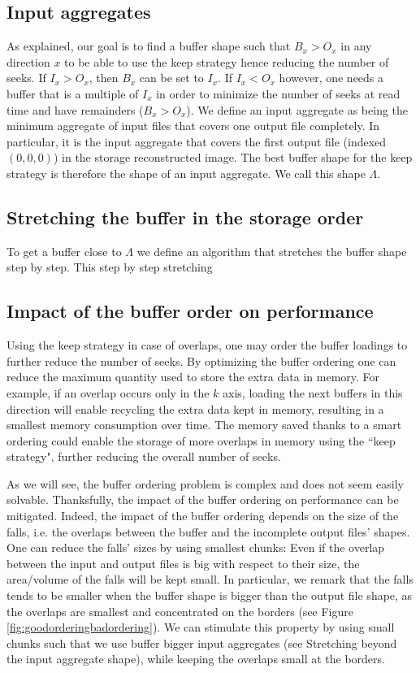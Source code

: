 \documentclass[conference]{IEEEtran}
\begin{document}
\subsection{Input aggregates}
As explained, our goal is to find a buffer shape such that $B_x>O_x$ in any
direction $x$ to be able to use the keep strategy hence reducing the number of
seeks. If $I_x > O_x$, then $B_x$ can be set to $I_x$. If $I_x < O_x$ however,
one needs a buffer that is a multiple of $I_x$ in order to minimize the number
of seeks at read time and have remainders ($B_x>O_x$). We define an input
aggregate as being the minimum aggregate of input files that covers one output
file completely. In particular, it is the input aggregate that covers the first
output file (indexed $(0,0,0)$) in the storage reconstructed image. The best
buffer shape for the keep strategy is therefore the shape of an input aggregate.
We call this shape $\Lambda$.

\subsection{Stretching the buffer in the storage order}
To get a buffer close to $\Lambda$ we define an algorithm that stretches the
buffer shape step by step. This step by step stretching

\subsection{Impact of the buffer order on performance}
Using the keep strategy in case of overlaps, one may order the buffer loadings
to further reduce the number of seeks. By optimizing the buffer ordering one can
reduce the maximum quantity used to store the extra data in memory. For example,
if an overlap occurs only in the $k$ axis, loading the next buffers in this
direction will enable recycling the extra data kept in memory, resulting in a
smallest memory consumption over time. The memory saved thanks to a smart
ordering could enable the storage of more overlaps in memory using the
``keep strategy", further reducing the overall number of seeks.

As we will see, the buffer ordering problem is complex and does not seem easily
solvable. Thanksfully, the impact of the buffer ordering on performance can be
mitigated. Indeed, the impact of the buffer ordering depends on the size of the
falls, i.e. the overlaps between the buffer and the incomplete output files'
shapes. One can reduce the falls' sizes by using smallest chunks: Even if the
overlap between the input and output files is big with respect to their size,
the area/volume of the falls will be kept small. In particular, we remark that
the falls tends to be smaller when the buffer shape is bigger than the output
file shape, as the overlaps are smallest and concentrated on the borders (see
Figure \ref{fig:goodorderingbadordering}). We can stimulate this property by
using small chunks such that we use buffer bigger input aggregates (see
Stretching beyond the input aggregate shape), while keeping the overlaps small
at the borders.
\end{document}
